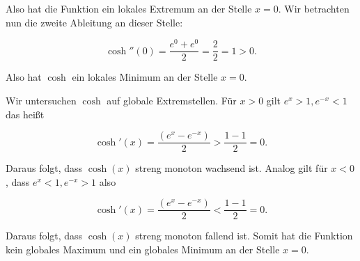\documentclass{article}
\begin{document}
Also hat die Funktion ein lokales Extremum an der Stelle
$ x = 0 $.
Wir betrachten nun die zweite Ableitung an dieser Stelle:

\[
\cosh''(0)
=
\frac{e^0 + e^0}{2}
=
\frac{2}{2}
= 1 > 0.
\]

Also hat 
$ \cosh $
ein lokales Minimum an der Stelle
$ x = 0 $.

Wir untersuchen 
$ \cosh $
auf globale Extremstellen.
Für 
$ x > 0 $
gilt
$ e^x > 1, e^{ - x} < 1 $ das heißt

\[
\cosh'(x) = \frac{(e^x - e^{ - x})}{2}
> \frac{1 - 1}{2} = 0.
\]

Daraus folgt, dass 
$ \cosh(x) $ streng monoton wachsend ist.
Analog gilt für
$ x < 0 $,
dass
$ e^x < 1, e^{ - x} > 1 $ also

\[
\cosh'(x) = \frac{(e^x - e^{ - x})}{2}
< \frac{1 - 1}{2} = 0.
\]

Daraus folgt, dass 
$ \cosh(x) $ streng monoton fallend ist.
Somit hat die Funktion kein globales Maximum und ein globales Minimum an der Stelle
$ x = 0 $.
\end{document}
